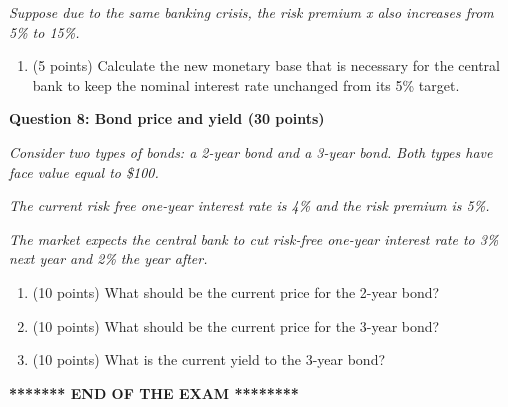 \documentclass[12pt]{article}
\begin{document}
\textit{Suppose due to the same banking crisis, the risk premium x also increases from 5\% to 15\%. }
\begin{enumerate}[label=\alph*., resume]
    \item (5 points) Calculate the new monetary base that is necessary for the central bank to keep the nominal interest rate unchanged from its 5\% target.
\end{enumerate}

\newpage
\textbf{Question 8: Bond price and yield (30 points)}

\textit{Consider two types of bonds: a 2-year bond and a 3-year bond.  Both types have face value equal to \$100. }

\textit{The current risk free one-year interest rate is 4\% and the risk premium is 5\%. }

\textit{The market expects the central bank to cut risk-free one-year interest rate to 3\% next year and 2\% the year after.}

\begin{enumerate}[label=\alph*.]
    \item (10 points) What should be the current price for the 2-year bond? 
    \item (10 points) What should be the current price for the 3-year bond? 
    \item (10 points) What is the current yield to the 3-year bond?
\end{enumerate}

\vspace{300pt}
\begin{center}
    \textbf{\Large ******** END OF THE EXAM ********}
\end{center}
\end{document}
